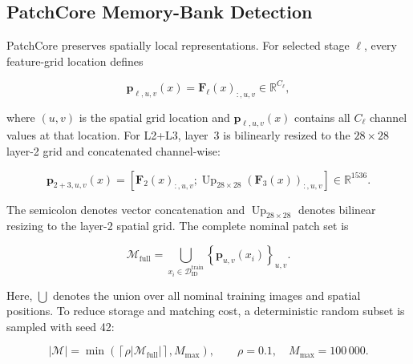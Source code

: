 \documentclass[fleqn,12pt]{olplainarticle}
\begin{document}
\subsection{PatchCore Memory-Bank Detection}
\label{subsec:patchcore_method}

PatchCore preserves spatially local representations. For selected stage
$\ell$, every feature-grid location defines

\begin{equation}
    \mathbf{p}_{\ell,u,v}(x)
    =
    \mathbf{F}_{\ell}(x)_{:,u,v}
    \in\mathbb{R}^{C_{\ell}},
    \label{eq:method_patch_embedding}
\end{equation}

where $(u,v)$ is the spatial grid location and
$\mathbf{p}_{\ell,u,v}(x)$ contains all $C_{\ell}$ channel values at that
location. For L2+L3, layer~3 is bilinearly resized to the $28\times28$
layer-2 grid and concatenated channel-wise:

\begin{equation}
    \mathbf{p}_{2+3,u,v}(x)
    =
    \left[
        \mathbf{F}_{2}(x)_{:,u,v};
        \operatorname{Up}_{28\times28}
        \!\left(
            \mathbf{F}_{3}(x)
        \right)_{:,u,v}
    \right]
    \in\mathbb{R}^{1536}.
    \label{eq:method_multilayer_patch_embedding}
\end{equation}

The semicolon denotes vector concatenation and
$\operatorname{Up}_{28\times28}$ denotes bilinear resizing to the layer-2
spatial grid. The complete nominal patch set is

\begin{equation}
    \mathcal{M}_{\mathrm{full}}
    =
    \bigcup_{x_i\in\mathcal{D}_{\mathrm{ID}}^{\mathrm{train}}}
    \left\{
        \mathbf{p}_{u,v}(x_i)
    \right\}_{u,v}.
    \label{eq:method_full_patch_memory}
\end{equation}

Here, $\bigcup$ denotes the union over all nominal training images and spatial
positions. To reduce storage and matching cost, a deterministic random subset
is sampled with seed 42:

\begin{equation}
    |\mathcal{M}|
    =
    \min
    \left(
        \left\lceil
            \rho|\mathcal{M}_{\mathrm{full}}|
        \right\rceil,
        M_{\max}
    \right),
    \qquad
    \rho=0.1,
    \quad
    M_{\max}=100\,000.
    \label{eq:method_patchcore_coreset_size}
\end{equation}
\end{document}
